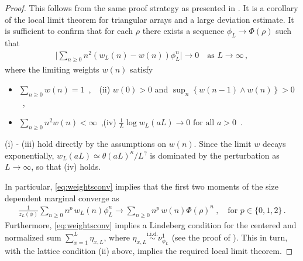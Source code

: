 \documentclass[pdflatex,sn-mathphys-num]{sn-jnl}%
\theoremstyle{thmstyleone}%
\theoremstyle{thmstyletwo}%
\theoremstyle{thmstylethree}%
\begin{document}
\begin{proof} 
This follows from the same proof strategy as presented in \cite[Proposition A.1]{bib_CGG22}. It is a corollary of the local limit theorem for triangular arrays \cite{bib_DM95} and a large deviation estimate. It is sufficient to confirm that for each $\rho$ there exists a sequence $\phi_L \to \Phi(\rho)$ such that
\begin{align}
    \label{eq:weightsconv}
    \Big| \sum_{n\geq 0} n^2 \left( w_L (n) - w(n) \right) \phi_L^n \Big| \to 0 \quad \textrm{as } L \to \infty\,,
\end{align}
where the limiting weights $w(n)$ satisfy
\begin{itemize}\setlength{\itemindent}{2em}
	\item[(i)] $\sum_{n \geq 0} w(n) =1$\ ,\qquad\ \ (ii) $w(0) > 0$ and $\sup_{n} \left\{w(n-1) \wedge w(n)\right\} > 0$\ ,
	\item[(iii)] $\sum_{n \geq 0} n^2 w(n) < \infty$\ ,\quad (iv) $\frac{1}{L} \log w_L (a L) \to 0 \text{ for all } a>0$\ .
\end{itemize}
(i) - (iii) hold directly by the assumptions on $w(n)$. Since the limit $w$ decays exponentially, $w_L (aL )\simeq \theta (aL)^\kappa /L^\gamma $ is dominated by the perturbation as $L\to\infty$, so that (iv) holds. 

In particular, \eqref{eq:weightsconv} implies that the first two moments of the size dependent marginal converge as 
\begin{align}
    \label{eq:momsconv}
    \frac{1}{z_L (\phi )}\sum_{n\geq 0} n^p\, w_L (n)\phi_L^n \to \sum_{n\geq 0} n^p\, w (n)\Phi(\rho)^n  \ ,\quad \textrm{for } p \in \{0,1,2\}\,.
\end{align}
Furthermore, \eqref{eq:weightsconv} implies a Lindeberg condition for the centered and normalized sum $\sum_{x=1}^L\eta_{x,L}$, where $\eta_{x,L}\overset{\text{i.i.d.}}{\sim}  \nu_{\phi_L}^1$ (see the proof of \cite[Lemma A.4]{bib_CGG22}).
This in turn, with the lattice condition (ii) above, implies the required local limit theorem.


\end{proof}
\end{document}
